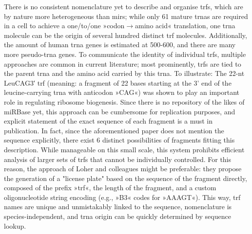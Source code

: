 There is no consistent nomenclature yet to describe and organise \acp{trf}, which are by nature more heterogeneous than \acp{mir}; while only 61 mature \acp{trna} are required in a cell to achieve a one\-/to\-/one »codon$\to$amino acid« translation, one \ac{trna} molecule can be the origin of several hundred distinct \ac{trf} molecules. Additionally, the amount of human \ac{trna} genes is estimated at 500-600,\cite{Parisien2013} and there are many more pseudo-\ac{trna} genes. To communicate the identity of individual \acp{trf}, multiple approaches are common in current literature; most prominently, \acp{trf} are tied to the parent \ac{trna} and the amino acid carried by this \ac{trna}. To illustrate: The 22-nt LeuCAG3′ \ac{trf} (meaning: a fragment of 22 bases starting at the 3' end of the leucine-carrying \ac{trna} with anticodon »CAG«) was shown to play an important role in regulating ribosome biogenesis.\cite{Kim2017} Since there is no repository of the likes of miRBase yet, this approach can be cumbersome for replication purposes, and explicit statement of the exact sequence of each fragment is a must in publication. In fact, since the aforementioned paper does not mention the sequence explicitly, there exist 6 distinct possibilities of fragments fitting this description. While manageable on this small scale, this system prohibits efficient analysis of larger sets of \acp{trf} that cannot be individually controlled. For this reason, the approach of Loher and colleagues\cite{Loher2017} might be preferable: they propose the generation of a "license plate" based on the sequence of the fragment directly, composed of the prefix »\ac{trf}«, the length of the fragment, and a custom oligonucleotide string encoding (e.g., »B3« codes for »AAAGT«). This way, \ac{trf} names are unique and unmistakably linked to the sequence, nomenclature is species-independent, and \ac{trna} origin can be quickly determined by sequence lookup.



